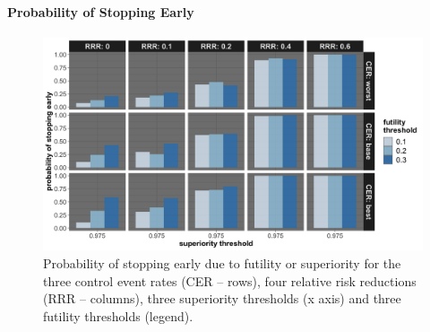 \documentclass[]{article}
\let\oldparagraph\paragraph
\renewcommand{\paragraph}[1]{\oldparagraph{#1}\mbox{}}
\begin{document}
\hypertarget{probability-of-stopping-early-1}{%
\paragraph{Probability of Stopping
Early}\label{probability-of-stopping-early-1}}

\begin{figure}
  \caption{Probability of stopping early due to futility or superiority for the three control event rates (CER – rows),
  four relative risk reductions (RRR – columns), three superiority thresholds (x axis) and three futility thresholds
  (legend).}
  \includegraphics{../p1_plots/batch_size_nb_2000/prob_stop_early_p1.png}
\end{figure}
\end{document}
